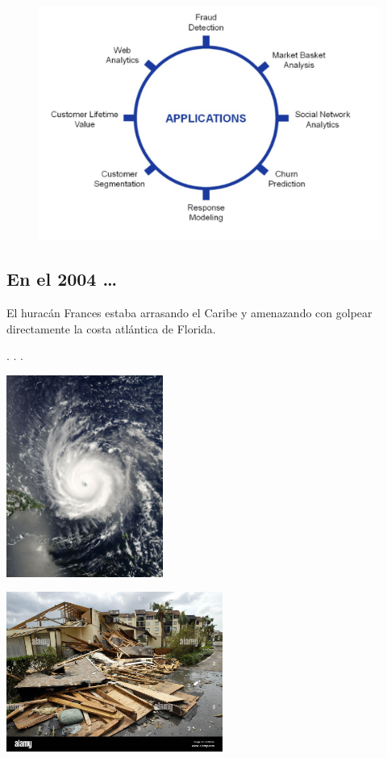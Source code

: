 \documentclass[
  letterpaper,
  DIV=11,
  numbers=noendperiod]{scrartcl}
\begin{document}
\begin{figure}

{\centering \includegraphics[width=5.05208in,height=\textheight]{images/clipboard-3242954590.png}

}

\end{figure}

\hypertarget{en-el-2004}{%
\subsection{En el 2004 \ldots{}}\label{en-el-2004}}

El huracán Frances estaba arrasando el Caribe y amenazando con golpear
directamente la costa atlántica de Florida.

. . .

\includegraphics[width=2.02083in,height=\textheight]{images/clipboard-123225538.png}

\includegraphics[width=2.79167in,height=\textheight]{Introduccion_files/mediabag/ft-pierce-9-6-04-un-.jpg}
\end{document}
